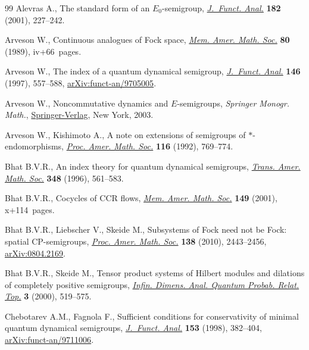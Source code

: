 \documentclass[11pt]{article}
\numberwithin{equation}{section}
\numberwithin{equation}{section}
\begin{document}
\begin{thebibliography}{99}
Alevras A., The standard form of an {$E_0$}-semigroup, \href{https://doi.org/10.1006/jfan.2000.3716}{\textit{J.~Funct. Anal.}}
 \textbf{182} (2001), 227--242.

Arveson W., Continuous analogues of {F}ock space, \href{https://doi.org/10.1090/memo/0409}{\textit{Mem. Amer. Math.
 Soc.}} \textbf{80} (1989), iv+66~pages.

Arveson W., The index of a quantum dynamical semigroup, \href{https://doi.org/10.1006/jfan.1996.3045}{\textit{J.~Funct.
 Anal.}} \textbf{146} (1997), 557--588, \href{https://arxiv.org/abs/funct-an/9705005}{arXiv:funct-an/9705005}.

Arveson W., Noncommutative dynamics and {$E$}-semigroups, \textit{Springer Monogr.
 Math.}, \href{https://doi.org/10.1007/978-0-387-21524-2}{Springer-Verlag}, New York, 2003.

Arveson W., Kishimoto A., A note on extensions of semigroups of
 {$*$}-endomorphisms, \href{https://doi.org/10.2307/2159445}{\textit{Proc. Amer. Math. Soc.}} \textbf{116} (1992),
 769--774.

Bhat B.V.R., An index theory for quantum dynamical semigroups, \href{https://doi.org/10.1090/S0002-9947-96-01520-6}{\textit{Trans.
 Amer. Math. Soc.}} \textbf{348} (1996), 561--583.

Bhat B.V.R., Cocycles of {CCR} flows, \href{https://doi.org/10.1090/memo/0709}{\textit{Mem. Amer. Math. Soc.}}
 \textbf{149} (2001), x+114~pages.

Bhat B.V.R., Liebscher V., Skeide M., Subsystems of {F}ock need not be {F}ock:
 spatial {CP}-semigroups, \href{https://doi.org/10.1090/S0002-9939-10-10260-3}{\textit{Proc. Amer. Math. Soc.}} \textbf{138} (2010),
 2443--2456, \href{https://arxiv.org/abs/0804.2169}{arXiv:0804.2169}.

Bhat B.V.R., Skeide M., Tensor product systems of {H}ilbert modules and
 dilations of completely positive semigroups, \href{https://doi.org/10.1142/S0219025700000261}{\textit{Infin. Dimens. Anal.
 Quantum Probab. Relat. Top.}} \textbf{3} (2000), 519--575.

Chebotarev A.M., Fagnola F., Sufficient conditions for conservativity of
 minimal quantum dynamical semigroups, \href{https://doi.org/10.1006/jfan.1997.3189}{\textit{J.~Funct. Anal.}} \textbf{153}
 (1998), 382--404, \href{https://arxiv.org/abs/funct-an/9711006}{arXiv:funct-an/9711006}.


\end{thebibliography}
\end{document}
